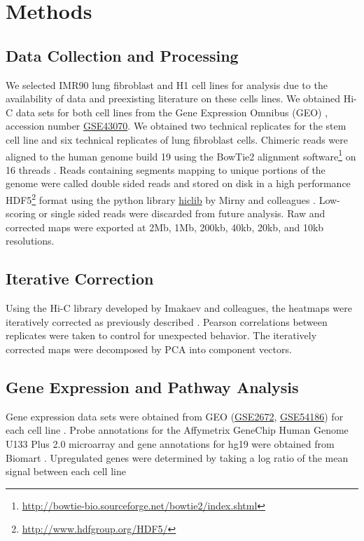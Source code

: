 \chapter{Methods}

\section*{Data Collection and Processing}

We selected IMR90 lung fibroblast and H1  cell lines for analysis due to the availability of data and
preexisting literature on these cells lines.  We obtained Hi-C data sets for both cell lines from the Gene Expression Omnibus
(GEO) \citep{edgar2002}, accession number \href{http://www.ncbi.nlm.nih.gov/geo/query/acc.cgi?acc=GSE43070}{GSE43070}.  We obtained
two technical replicates for the stem cell line and six technical replicates of lung fibroblast cells.  Chimeric reads were
aligned to the human genome build 19 using the BowTie2 alignment
software\footnote{\url{http://bowtie-bio.sourceforge.net/bowtie2/index.shtml}} on 16 threads \citep{langmead2012}.  Reads containing
segments mapping to unique portions of the genome were called double sided reads and stored on disk in a high performance
HDF5\footnote{\url{http://www.hdfgroup.org/HDF5/}} format using the python library \href{https://bitbucket.org/mirnylab/hiclib}{hiclib}
by Mirny and colleagues \citep{imakaev2012}.  Low-scoring or single sided reads were discarded from future analysis.  Raw and
corrected maps were exported at 2Mb, 1Mb, 200kb, 40kb, 20kb, and 10kb resolutions.

\section*{Iterative Correction}

Using the Hi-C library developed by Imakaev and colleagues, the heatmaps were iteratively corrected as previously
described \citep{imakaev2012}.  Pearson correlations between replicates were taken to control for unexpected behavior.
The iteratively corrected maps were decomposed by \gls{PCA} into component vectors.

\section*{Gene Expression and Pathway Analysis}

Gene expression data sets were obtained from \gls{GEO} (\href{http://www.ncbi.nlm.nih.gov/geo/query/acc.cgi?acc=GSE2672}{GSE2672},
\href{http://www.ncbi.nlm.nih.gov/geo/query/acc.cgi?acc=GSE54186}{GSE54186}) for each cell line \citep{kim2005} \citep{kim2014}.  Probe
annotations for the Affymetrix GeneChip Human Genome U133 Plus 2.0 microarray and gene annotations for hg19 were obtained from
Biomart \citep{kasprzyk2011}.  Upregulated genes were determined by taking a log ratio of the mean signal between each cell line

